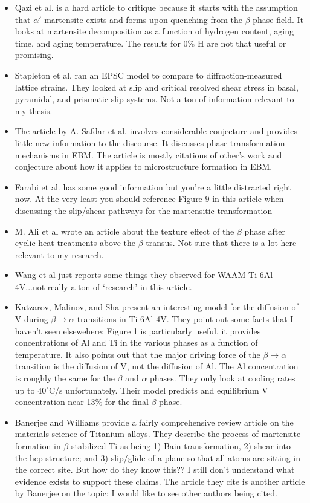 \begin{itemize}
	\item Qazi et al. \cite{Qazi2003} is a hard article to critique because it starts with the assumption that $\alpha'$ martensite exists and forms upon quenching from the $\beta$ phase field. It looks at martensite decomposition as a function of hydrogen content, aging time, and aging temperature. The results for 0$\%$ H are not that useful or promising.
	\item Stapleton et al. \cite{Stapleton2008} ran an EPSC model to compare to diffraction-measured lattice strains. They looked at slip and critical resolved shear stress in basal, pyramidal, and prismatic slip systems. Not a ton of information relevant to my thesis.
	\item The article by A. Safdar et al. \cite{Safdar2012} involves considerable conjecture and provides little new information to the discourse. It discusses phase transformation mechanisms in EBM. The article is mostly citations of other's work and conjecture about how it applies to microstructure formation in EBM.
	\item Farabi et al. \cite{Farabi2018} has some good information but you're a little distracted right now. At the very least you should reference Figure 9 in this article when discussing the slip/shear pathways for the martensitic transformation
	\item M. Ali et al \cite{Ali2020} wrote an article about the texture effect of the $\beta$ phase after cyclic heat treatments above the $\beta$ transus. Not sure that there is a lot here relevant to my research.
	\item Wang et al \cite{Wang2019} just reports some things they observed for WAAM Ti-6Al-4V...not really a ton of `research' in this article.
	\item Katzarov, Malinov, and Sha \cite{Katzarov2002} present an interesting model for the diffusion of V during $\beta \to \alpha$ transitions in Ti-6Al-4V. They point out some facts that I haven't seen elsewehere; Figure 1 is particularly useful, it provides concentrations of Al and Ti in the various phases as a function of temperature. It also points out that the major driving force of the $\beta \to \alpha$ transition is the diffusion of V, not the diffusion of Al. The Al concentration is roughly the same for the $\beta$ and $\alpha$ phases. They only look at cooling rates up to $40^\circ$C/s unfortunately. Their model predicts and equilibrium V concentration near 13\% for the final $\beta$ phase.
	\item Banerjee and Williams \cite{Banerjee2013} provide a fairly comprehensive review article on the materials science of Titanium alloys. They describe the process of martensite formation in $\beta$-stabilized Ti as being 1) Bain transformation, 2) shear into the hcp structure; and 3) slip/glide of a plane so that all atoms are sitting in the correct site. But how do they know this?? I still don't understand what evidence exists to support these claims. The article they cite is another article by Banerjee on the topic; I would like to see other authors being cited.

\end{itemize}
